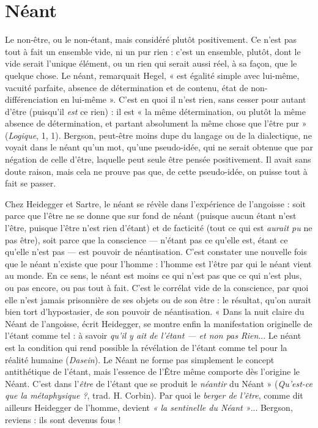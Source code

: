 \section{Néant}
Le non-être, ou le non-étant, mais considéré plutôt positivement.
Ce n’est pas tout à fait un ensemble vide, ni un pur rien : c’est un
ensemble, plutôt, dont le vide serait l’unique élément, ou un rien qui serait
aussi réel, à sa façon, que le quelque chose. Le néant, remarquait Hegel, « est
égalité simple avec lui-même, vacuité parfaite, absence de détermination et de
contenu, état de non-différenciation en lui-même ». C’est en quoi il n’est rien,
sans cesser pour autant d’être (puisqu'il {\it est} ce rien) : il est « la même détermination,
ou plutôt la même absence de détermination, et partant absolument la
même chose que l'être pur » ({\it Logique}, 1, 1). Bergson, peut-être moins dupe du
langage ou de la dialectique, ne voyait dans le néant qu’un mot, qu’une
pseudo-idée, qui ne serait obtenue que par négation de celle d’être, laquelle
peut seule être pensée positivement. Il avait sans doute raison, mais cela ne
prouve pas que, de cette pseudo-idée, on puisse tout à fait se passer.

Chez Heidegger et Sartre, le néant se révèle dans l’expérience de l’angoisse :
soit parce que l’être ne se donne que sur fond de néant (puisque aucun étant
n’est l’être, puisque l’être n’est rien d’étant) et de facticité (tout ce qui est {\it aurait
pu} ne pas être), soit parce que la conscience — n’étant pas ce qu’elle est, étant ce
qu’elle n’est pas — est pouvoir de néantisation. C’est constater une nouvelle fois
que le néant n’existe que pour l’homme : l’homme est l'être par qui le néant
vient au monde. En ce sens, le néant est moins ce qui n’est pas que ce qui n’est
plus, ou pas encore, ou pas tout à fait. C’est le corrélat vide de la conscience,
par quoi elle n’est jamais prisonnière de ses objets ou de son être : le résultat,
qu’on aurait bien tort d’hypostasier, de son pouvoir de néantisation. « Dans la
nuit claire du Néant de l’angoisse, écrit Heidegger, se montre enfin la manifestation
originelle de l’étant comme tel : à savoir {\it qu'il y ait de l'étant — et non pas
Rien}... Le néant est la condition qui rend possible la révélation de l’étant
comme tel pour la réalité humaine ({\it Dasein}). Le Néant ne forme pas simplement
le concept antithétique de l’étant, mais l'essence de l’Être même comporte
dès l’origine le Néant. C’est dans l’{\it être} de l’étant que se produit le {\it néantir}
du Néant » ({\it Qu'est-ce que la métaphysique ?}, trad. H. Corbin). Par quoi le {\it berger
de l'être}, comme dit ailleurs Heidegger de l’homme, devient {\it « la sentinelle du
Néant »}... Bergson, reviens : ils sont devenus fous !

